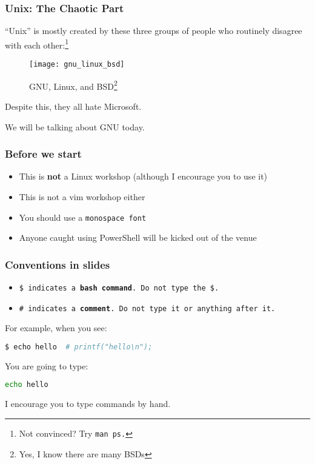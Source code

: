 \begin{frame}
\frametitle{Unix: The Chaotic Part}
``Unix'' is mostly created by these three groups of people who routinely
disagree with each other:\footnote{Not convinced? Try \tt{man ps}.}
\begin{figure}[h]
    \centering
    \texttt{[image: gnu\_linux\_bsd]}
    \caption{GNU, Linux, and BSD\footnote{Yes, I know there are many BSDs}}
\end{figure}
Despite this, they all hate Microsoft.

We will be talking about GNU today.
\end{frame}

\begin{frame}
\frametitle{Before we start}
\begin{itemize}
    \item This is \textbf{not} a Linux workshop
        (although I encourage you to use it)
    \item This is not a vim workshop either
    \item You should use a \tt{monospace} font
    \item Anyone caught using PowerShell will be kicked out of the venue
\end{itemize}
\end{frame}

\begin{frame}[fragile]
\frametitle{Conventions in slides}
\begin{itemize}
    \item \tt{\$} indicates a \textbf{bash command}.
        Do not type the \tt{\$}.
    \item \tt{\#} indicates a \textbf{comment}.
        Do not type it or anything after it.
\end{itemize}
For example, when you see:
\begin{lstlisting}[language=bash]
$ echo hello  # printf("hello\n");
\end{lstlisting}
You are going to type:
\begin{lstlisting}[language=bash]
echo hello
\end{lstlisting}
I encourage you to type commands by hand.
\end{frame}
